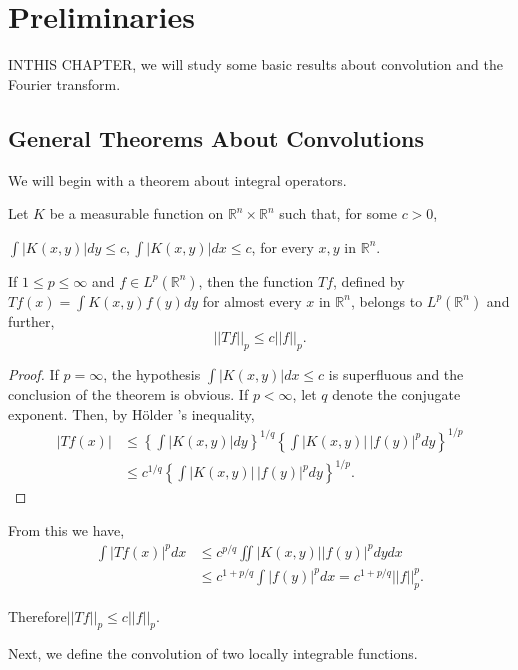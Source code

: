 
\chapter{Preliminaries}\label{chap1}

IN\pageoriginale THIS CHAPTER, we will study some basic results about
convolution and the Fourier transform. 

\section{General Theorems About Convolutions}\label{chap1:sec1}

We will begin with a theorem about integral operators.

\begin{thm}\label{chap1:sec1:thm1.1} %
  Let $K$ be a measurable function on $\mathbb{R}^n \times
  \mathbb{R}^n$ such that, for some $c > 0$, 
  
  $\int |K(x,y)|dy \leq c, \int |K(x,y)| dx \leq c$, for every
  $x,y$ in $\mathbb{R}^n$. 
\end{thm}

If $1 \leq p \leq \infty$ and $f \in L^p (\mathbb{R}^n)$, then the
function $Tf$, defined by $Tf(x)= \int K(x,y) f(y)dy$ for almost every
$x$ in $\mathbb{R}^n$, belongs to $L^p(\mathbb{R}^n)$ and further, 
$$
|| Tf  || _p \leq c || f ||_p.
$$
\begin{proof}
  If $p= \infty$, the hypothesis $\int |K(x,y)| dx \leq c$ is
  superfluous and the conclusion of the theorem is obvious. If $p <
  \infty$, let $q$ denote the conjugate exponent. Then, by H\"{o}lder 's
  inequality, 
  \begin{align*}
    |Tf (x)|&\leq \left\{ \int |K(x,y)|dy \right\} ^{1/q} \left\{ \int
    |K(x,y)|\,|f(y)|^p dy \right\}^{1/p}\\ 
    & \leq c^{1/q} \left\{ \int |K(x,y)|\,|f(y)|^p dy \right\} ^{1/p}.
  \end{align*}
\end{proof}

\noindent
From this we have,
 \begin{align*}
   \int |Tf(x)|^p dx & \leq c^{p/q} \iint |K(x,y)||f(y)|^p dy dx \\
   & \leq c^{1+p/q} \int |f(y)|^p dx= c^{1+p/q} || f || ^p_p.
 \end{align*} 

\noindent
Therefore\pageoriginale $|| Tf || _p \leq c || f || _p$.

Next, we define the convolution of two locally integrable functions.

